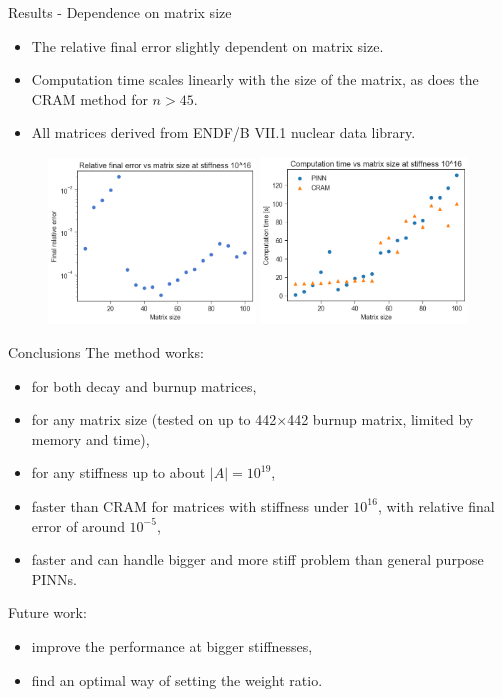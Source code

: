 \documentclass[9pt]{beamer}
\begin{document}
\begin{frame}[fragile]{Results - Dependence on matrix size}
\begin{itemize}
    \item The relative final error slightly dependent on matrix size.
    \item Computation time scales linearly with the size of the matrix, as does the CRAM method for $n > 45$.
    \item All matrices derived from ENDF/B VII.1 nuclear data library.
\end{itemize}
\begin{figure}
    \centering
    \includegraphics[width=0.49\textwidth]{error_vs_size.png}
    \includegraphics[width=0.49\textwidth]{time_vs_size.png}
    \label{fig:my_label}
\end{figure}
\end{frame}


\begin{frame}[fragile]{Conclusions}
The method works:
\begin{itemize}
\item for both decay and burnup matrices,
\item for any matrix size (tested on up to 442$\times$442 burnup matrix, limited by memory and time),
\item for any stiffness up to about $|A| = 10^{19}$,
\item faster than CRAM for matrices with stiffness under $10^{16}$, with relative final error of around $10^{-5}$,
\item faster and can handle bigger and more stiff problem than general purpose PINNs.
\end{itemize}
Future work:
\begin{itemize}
    \item improve the performance at bigger stiffnesses,
    \item find an optimal way of setting the weight ratio.
\end{itemize}
\end{frame}
\end{document}
